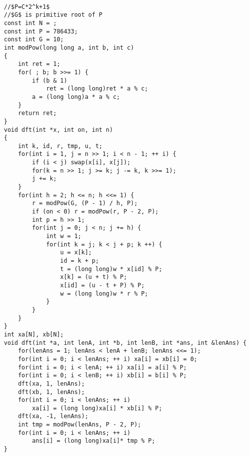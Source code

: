\begin{lstlisting}

//$P=C*2^k+1$
//$G$ is primitive root of P
const int N = ;
const int P = 786433; 
const int G = 10;
int modPow(long long a, int b, int c)
{
	int ret = 1;
	for( ; b; b >>= 1) {
		if (b & 1)
			ret = (long long)ret * a % c;
		a = (long long)a * a % c;
	}
	return ret;
}
void dft(int *x, int on, int n)
{
	int k, id, r, tmp, u, t;
	for(int i = 1, j = n >> 1; i < n - 1; ++ i) {
		if (i < j) swap(x[i], x[j]);
		for(k = n >> 1; j >= k; j -= k, k >>= 1);
		j += k;
	}
	for(int h = 2; h <= n; h <<= 1) {
		r = modPow(G, (P - 1) / h, P);
		if (on < 0) r = modPow(r, P - 2, P);
		int p = h >> 1;
		for(int j = 0; j < n; j += h) {
			int w = 1;
			for(int k = j; k < j + p; k ++) {
				u = x[k];
				id = k + p;
				t = (long long)w * x[id] % P;
				x[k] = (u + t) % P;
				x[id] = (u - t + P) % P;
				w = (long long)w * r % P;
			}
		}
	}
}
int xa[N], xb[N];
void dft(int *a, int lenA, int *b, int lenB, int *ans, int &lenAns) {
	for(lenAns = 1; lenAns < lenA + lenB; lenAns <<= 1);
	for(int i = 0; i < lenAns; ++ i) xa[i] = xb[i] = 0;
	for(int i = 0; i < lenA; ++ i) xa[i] = a[i] % P;
	for(int i = 0; i < lenB; ++ i) xb[i] = b[i] % P;
	dft(xa, 1, lenAns);
	dft(xb, 1, lenAns);
	for(int i = 0; i < lenAns; ++ i)
		xa[i] = (long long)xa[i] * xb[i] % P;
	dft(xa, -1, lenAns);
	int tmp = modPow(lenAns, P - 2, P);
	for(int i = 0; i < lenAns; ++ i) 
		ans[i] = (long long)xa[i]* tmp % P;
}
\end{lstlisting}